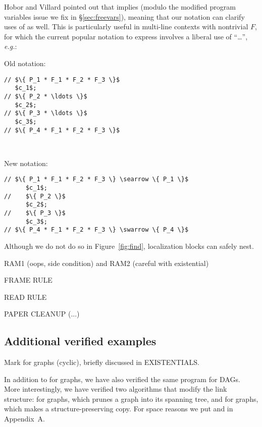 Hobor and Villard pointed out that  implies  (modulo the modified program variables issue we fix in \S\ref{sec:freevars}), meaning that our notation can clarify uses of  as well.  This is particularly useful in multi-line contexts with nontrivial $F$, for which the current popular notation to express  involves a liberal use of ``\ldots'', \emph{e.g.}:

\vspace{5pt}

\begin{minipage}{.19\textwidth}
Old notation:
\begin{lstlisting}
// $\{ P_1 * F_1 * F_2 * F_3 \}$
   $c_1$;
// $\{ P_2 * \ldots \}$
   $c_2$;
// $\{ P_3 * \ldots \}$
   $c_3$;
// $\{ P_4 * F_1 * F_2 * F_3 \}$
\end{lstlisting}
\end{minipage} \vline ~~~
\begin{minipage}{.2\textwidth}
New notation:
\begin{lstlisting}[numbers=none]
// $\{ P_1 * F_1 * F_2 * F_3 \} \searrow \{ P_1 \}$
      $c_1$;
//    $\{ P_2 \}$
      $c_2$;
//    $\{ P_3 \}$
      $c_3$;
// $\{ P_4 * F_1 * F_2 * F_3 \} \swarrow \{ P_4 \}$
\end{lstlisting}
\end{minipage}
\vspace{-0.75ex}


Although we do not do so in Figure~\ref{fig:find}, localization blocks can safely nest.

RAM1 (oops, side condition) and RAM2 (careful with existential)

FRAME RULE

READ RULE

PAPER CLEANUP (...)

\subsection{Additional verified examples}
\label{sec:application}

Mark for graphs (cyclic), briefly discussed in EXISTENTIALS.

In addition to  for graphs, we have also verified the same program for DAGs.
More interestingly, we have verified two algorithms that modify the link structure:
 for graphs, which prunes a graph into its spanning tree, and 
for graphs, which makes a structure-preserving copy.  For space reasons we put
 and  in Appendix~A\hide{\ref{apx:spanning}}.


